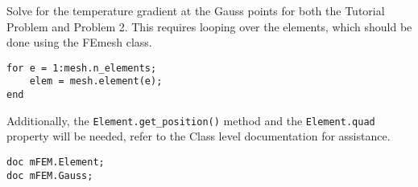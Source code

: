 Solve for the temperature gradient at the Gauss points for both the Tutorial Problem and Problem 2. This requires looping over the elements, which should be done using the FEmesh class.
\begin{lstlisting}
for e = 1:mesh.n_elements;
	elem = mesh.element(e);
end
\end{lstlisting}
Additionally, the \texttt{Element.get\_position()} method and the \texttt{Element.quad} property will be needed, refer to the Class level documentation for assistance.
\begin{lstlisting}
doc mFEM.Element;
doc mFEM.Gauss;
\end{lstlisting}

